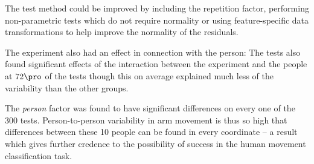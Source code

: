\documentclass[11pt,fleqn]{article}
\begin{document}
The test method could be improved by including the repetition factor, performing non-parametric tests which do not require normality or using feature-specific data transformations to help improve the normality of the residuals.

The experiment also had an effect in connection with the person: The tests also found significant effects of the interaction between the experiment and the people at \(72\pro\) of the tests though this on average explained much less of the variability than the other groups.

The \textit{person} factor was found to have significant differences on every one of the 300 tests. Person-to-person variability in arm movement is thus so high that differences between these 10 people can be found in every coordinate -- a result which gives further credence to the possibility of success in the human movement classification task.






%
%
\end{document}
